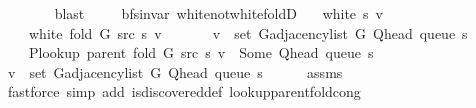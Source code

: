 \begin{isabellebody}
\ \ \ \ \ \ \isamarkupfalse%
\ blast\isanewline
\ \ \isamarkupfalse%
\isanewline
{}\isamarkupfalse%
%
\endisatagproof
{\isafoldproof}%
%
\isadelimproof
\isanewline
%
\endisadelimproof
\isanewline
{}\isamarkupfalse%
\ {\isacharparenleft}{\kern0pt}\ bfs{\isacharunderscore}{\kern0pt}invar{\isacharparenright}{\kern0pt}\ white{\isacharunderscore}{\kern0pt}not{\isacharunderscore}{\kern0pt}white{\isacharunderscore}{\kern0pt}foldD{\isacharcolon}{\kern0pt}\isanewline
\ \ \ {\isachardoublequoteopen}white\ s\ v{\isachardoublequoteclose}\isanewline
\ \ \ {\isachardoublequoteopen}{\isasymnot}\ white\ {\isacharparenleft}{\kern0pt}fold\ G\ src\ s{\isacharparenright}{\kern0pt}\ v{\isachardoublequoteclose}\isanewline
\ \ \isanewline
\ \ \ \ {\isachardoublequoteopen}v\ {\isasymin}\ set\ {\isacharparenleft}{\kern0pt}G{\isachardot}{\kern0pt}adjacency{\isacharunderscore}{\kern0pt}list\ G\ {\isacharparenleft}{\kern0pt}Q{\isacharunderscore}{\kern0pt}head\ {\isacharparenleft}{\kern0pt}queue\ s{\isacharparenright}{\kern0pt}{\isacharparenright}{\kern0pt}{\isacharparenright}{\kern0pt}{\isachardoublequoteclose}\isanewline
\ \ \ \ {\isachardoublequoteopen}P{\isacharunderscore}{\kern0pt}lookup\ {\isacharparenleft}{\kern0pt}parent\ {\isacharparenleft}{\kern0pt}fold\ G\ src\ s{\isacharparenright}{\kern0pt}{\isacharparenright}{\kern0pt}\ v\ {\isacharequal}{\kern0pt}\ Some\ {\isacharparenleft}{\kern0pt}Q{\isacharunderscore}{\kern0pt}head\ {\isacharparenleft}{\kern0pt}queue\ s{\isacharparenright}{\kern0pt}{\isacharparenright}{\kern0pt}{\isachardoublequoteclose}\isanewline
%
\isadelimproof
%
\endisadelimproof
%
\isatagproof
{}\isamarkupfalse%
\ {\isacharminus}{\kern0pt}\isanewline
\ \ \isamarkupfalse%
\ {\isachardoublequoteopen}v\ {\isasymin}\ set\ {\isacharparenleft}{\kern0pt}G{\isachardot}{\kern0pt}adjacency{\isacharunderscore}{\kern0pt}list\ G\ {\isacharparenleft}{\kern0pt}Q{\isacharunderscore}{\kern0pt}head\ {\isacharparenleft}{\kern0pt}queue\ s{\isacharparenright}{\kern0pt}{\isacharparenright}{\kern0pt}{\isacharparenright}{\kern0pt}{\isachardoublequoteclose}\isanewline
\ \ \ \ \isamarkupfalse%
\ assms\isanewline
\ \ \ \ \isamarkupfalse%
\ {\isacharparenleft}{\kern0pt}fastforce\ simp\ add{\isacharcolon}{\kern0pt}\ is{\isacharunderscore}{\kern0pt}discovered{\isacharunderscore}{\kern0pt}def\ lookup{\isacharunderscore}{\kern0pt}parent{\isacharunderscore}{\kern0pt}fold{\isacharunderscore}{\kern0pt}cong{\isacharparenright}{\kern0pt}\isanewline

\end{isabellebody}
